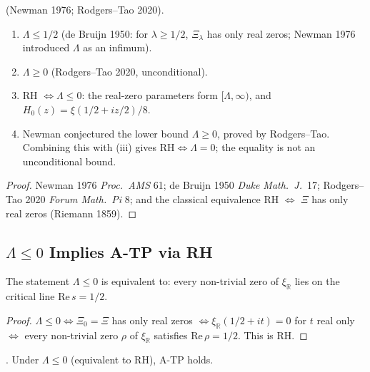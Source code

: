 \begin{theorem}
\label{v4-arith:w7-g:thm:dBN-bounds}
\ClaimStatusProvedElsewhere (Newman 1976; Rodgers--Tao 2020).
\begin{enumerate}
\item \(\Lambda\leq 1/2\) (de Bruijn 1950: for \(\lambda\geq 1/2\),
\(\Xi_{\lambda}\) has only real zeros; Newman 1976 introduced
\(\Lambda\) as an infimum).
\item \(\Lambda\geq 0\) (Rodgers--Tao 2020, unconditional).
\item RH \(\Leftrightarrow\Lambda\leq0\): the real-zero parameters form
\([\Lambda,\infty)\), and \(H_0(z)=\xi(1/2+iz/2)/8\).
\item Newman conjectured the lower bound \(\Lambda\geq0\), proved by
Rodgers--Tao. Combining this with (iii) gives
\(\mathrm{RH}\Longleftrightarrow\Lambda=0\); the equality is not an
unconditional bound.
\end{enumerate}
\end{theorem}

\begin{proof}
Newman 1976 \emph{Proc.~AMS} 61; de Bruijn 1950 \emph{Duke Math.~J.}~17;
Rodgers--Tao 2020 \emph{Forum Math.~Pi} 8; and the classical
equivalence RH \(\Leftrightarrow\) \(\Xi\) has only real zeros
(Riemann 1859).
\end{proof}

\subsection{\(\Lambda\leq 0\) Implies A-TP via RH}
\label{v4-arith:w7-g:de-Bruijn-Newman:sufficiency}

\begin{lemma}
\label{v4-arith:w7-g:lem:Lambda-leq-zero}
The statement \(\Lambda\leq 0\) is equivalent to:
every non-trivial zero of \(\xi_{\mathbb{R}}\) lies on the critical line
\(\mathrm{Re}\,s=1/2\).
\end{lemma}

\begin{proof}
\(\Lambda\leq 0\Leftrightarrow\Xi_{0}=\Xi\) has only real zeros
\(\Leftrightarrow\xi_{\mathbb{R}}(1/2+it)=0\) for \(t\) real only
\(\Leftrightarrow\) every non-trivial zero \(\rho\) of \(\xi_{\mathbb{R}}\)
satisfies \(\mathrm{Re}\,\rho=1/2\). This is RH.
\end{proof}

\begin{corollary}
\label{v4-arith:w7-g:cor:Lambda-implies-ATP}
\ClaimStatusProvedHereConditional. Under \(\Lambda\leq 0\) (equivalent to RH),
A-TP holds.
\end{corollary}

